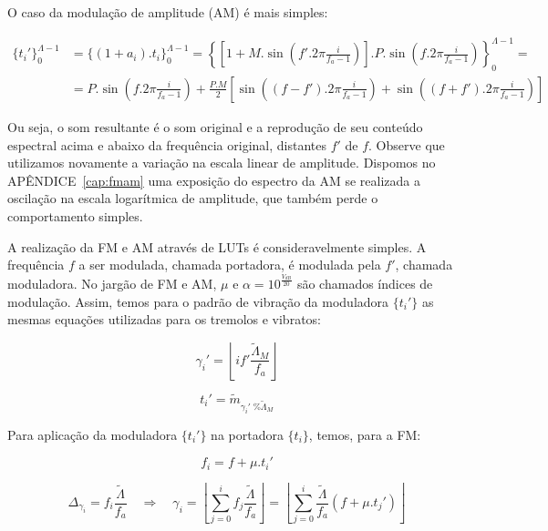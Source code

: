 O caso da modulação de amplitude (AM) é mais simples:

\begin{equation}\label{eq:am}
\begin{split}
\{t_i'\}_0^{\Lambda-1} & =\{(1+a_i) . t_i\}_0^{\Lambda-1}= \left \{ \left [ 1+M.\sin \left ( f'.2\pi\frac{i}{f_a -1} \right ) \right] . P .\sin \left ( f.2\pi\frac{i}{f_a -1} \right ) \right \}_0^{\Lambda-1} = \\
& = P.\sin \left( f.2\pi\frac{i}{f_a -1}  \right ) + \frac{P.M}{2} \left [ \sin \left( (f-f').2\pi\frac{i}{f_a -1}  \right ) + \sin \left( (f+f').2\pi\frac{i}{f_a -1}  \right ) \right ]
\end{split}
\end{equation}

Ou seja, o som resultante é o som original
e a reprodução de seu conteúdo espectral acima e abaixo da frequência
original, distantes $f'$ de $f$. Observe que utilizamos novamente a variação na escala linear de amplitude. Dispomos no APÊNDICE~\ref{cap:fmam} uma exposição do espectro da AM se realizada a oscilação na escala logarítmica de amplitude, que também perde o comportamento simples.

A realização da FM e AM através de LUTs é consideravelmente simples.
A frequência $f$ a ser modulada, chamada portadora, é modulada pela $f'$, chamada moduladora. No jargão de FM e AM, $\mu$ e $\alpha=10^{\frac{V_{dB}}{20}}$ são chamados índices de modulação. Assim, temos
para o padrão de vibração da moduladora $\{t_i'\}$ as mesmas equações utilizadas para os tremolos e vibratos:

\begin{equation}\label{fmGamma}
\gamma_i'=\left \lfloor i f' \frac{\widetilde{\Lambda}_M}{f_a} \right \rfloor
\end{equation}

\begin{equation}\label{fmAux}
t_i'=\widetilde{m}_{\gamma_i' \;\% \widetilde{\Lambda}_M}
\end{equation}

Para aplicação da moduladora $\{t_i'\}$ na portadora $\{t_i\}$,
temos, para a FM:

\begin{equation}\label{fmF}
f_i=f + \mu . t_i'
\end{equation}

\begin{equation}\label{fmGamma}
\Delta_{\gamma_i}=f_i\frac{\widetilde{\Lambda}}{f_a} \quad \Rightarrow \quad \gamma_i = \left \lfloor \sum_{j=0}^{i} f_j \frac{\widetilde{\Lambda}}{f_a} \right \rfloor = \left \lfloor \sum_{j=0}^{i} \frac{\widetilde{\Lambda}}{f_a}(f+\mu . t_j') \right\rfloor
\end{equation}

